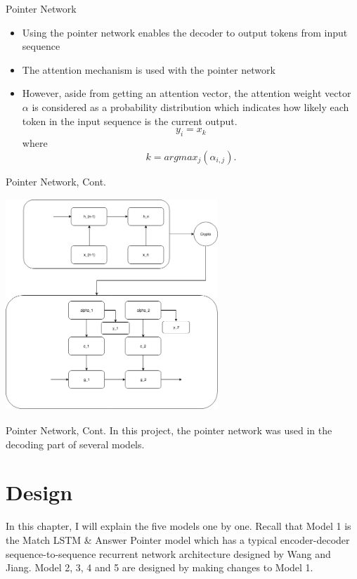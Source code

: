 \documentclass{beamer}
\begin{document}
\begin{frame}{Pointer Network}
    \begin{itemize}
        \item Using the pointer network enables the decoder to output tokens from input sequence
        \item The attention mechanism is used with the pointer network
        \item However, aside from getting an attention vector, the attention weight vector $\alpha$ is considered as a probability distribution which indicates how likely each token in the input sequence is the current output.
        $$y_i = x_k$$
        where
        $$k = argmax_j(\alpha _{i,j}).$$
    \end{itemize}
\end{frame}

\begin{frame}{Pointer Network, Cont.}
    \begin{center}
        \includegraphics[width=8cm, height=8cm]{figures/pointerNetwork.png}
    \end{center}

\end{frame}

\begin{frame}{Pointer Network, Cont.}
    In this project, the pointer network was used in the decoding part of several models.
\end{frame}
\section{Design}

\begin{frame}{}
    In this chapter, I will explain the five models one by one. Recall that Model 1 is the Match LSTM \& Answer Pointer model which has a typical encoder-decoder sequence-to-sequence recurrent network architecture designed by Wang and Jiang. Model 2, 3, 4 and 5 are designed by making changes to Model 1.
\end{frame}
\end{document}
